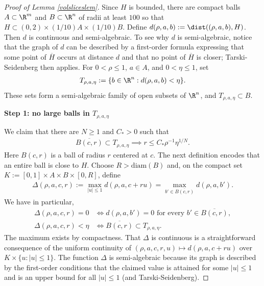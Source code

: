 \documentclass{article}
\numberwithin{equation}{section}
\theoremstyle{plain}
\begin{document}
\begin{proof}[Proof of Lemma \ref{volsliceslem}]
    Since $H$ is bounded, there are compact balls $A \subset \R^m$ and $B \subset \R^n$ of radii at least $100$ so that $H \subset (0,2) \times (1/10)A \times (1/10)B$. 
    Define $d(\rho,a,b) := \dist((\rho,a,b),H)$. 
    Then $d$ is continuous and semi-algebraic. 
    To see why $d$ is semi-algebraic, notice that the graph of $d$ can be described by a first-order formula expressing that some point of $\overline H$ occurs at distance $d$ and that no point of $\overline H$ is closer; Tarski-Seidenberg then applies.
    For $0 < \rho \leq 1$, $a \in A$, and $0 < \eta \leq 1$, set 
    \begin{align}\label{eq: sets Trhoaeta}
        T_{\rho,a,\eta} := \{b \in \R^n : d(\rho,a,b) < \eta\}.
    \end{align}
    These sets form a semi-algebraic family of open subsets of $\R^n$, and $T_{\rho,a,\eta} \subset B$. 


    \medskip

    \noindent \textbf{Step 1: no large balls in $T_{\rho,a,\eta}$}

    We claim that there are $N \geq 1$ and $C_* > 0$ such that 
    \begin{align}
        \overline{B(c,r)} \subset T_{\rho,a,\eta} \implies r \leq C_* \rho^{-1} \eta^{1/N}.\label{eq: no large balls}
    \end{align}
    Here $B(c, r)$ is a ball of radius $r$ centered at $c$. 
    The next definition encodes that an entire ball is close to $H$. Choose $R > \mathrm{diam}(B)$ and, on the compact set $K := [0, 1] \times A \times B \times [0,R]$, define 
    \begin{align}
        \Delta(\rho,a,c,r) := \max_{|u| \leq 1} d(\rho,a,c+ru) = \max_{b' \in \overline{B(c,r)}} d(\rho,a,b').
    \end{align}
    We have in particular, 
    \begin{align}
        \Delta(\rho,a,c,r) = 0 &\iff d(\rho,a,b') = 0 \text{ for every } b' \in \overline{B(c,r)},\\
        \Delta(\rho,a,c,r) < \eta &\iff \overline{B(c,r)} \subset T_{\rho,a,\eta}. \label{eq: Delta < eta inclusion}
    \end{align}
    The maximum exists  by compactness. That $\Delta$ is continuous is a straightforward consequence of the uniform continuity of $(\rho,a,c,r,u) \mapsto d(\rho,a,c+ru)$ over $K \times \{u : |u| \leq 1\}$. The function $\Delta$ is semi-algebraic because its graph is described by the first-order conditions that the claimed value is attained for some $|u| \leq 1$ and is an upper bound for all $|u| \leq 1$ (and Tarski-Seidenberg). 


\end{proof}
\end{document}
